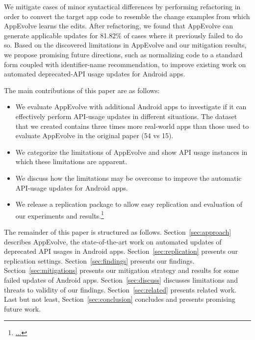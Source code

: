 We mitigate cases of minor syntactical differences by performing refactoring in order to convert the target app code to resemble the change examples from which AppEvolve learns the edits.
After refactoring, we found that AppEvolve can generate applicable updates for 81.82\% of cases where it previously failed to do so.
Based on the discovered limitations in AppEvolve and our mitigation results, we propose promising future directions, such as normalizing code to a standard form coupled with identifier-name recommendation, to improve existing work on automated deprecated-API usage updates for Android apps.

The main contributions of this paper are as follows:
\begin{itemize}
	\item We  evaluate AppEvolve with additional Android apps to investigate if it can effectively perform API-usage updates in different situations. The dataset that we created contains three times more real-world apps than those used to evaluate AppEvolve in the original paper (54 vs 15).
	\item We categorize the limitations of AppEvolve and show API usage instances in which these limitations are apparent.
	\item We discuss how the limitations may be overcome to improve the automatic API-usage updates for Android apps.
	\item We release a replication package to allow easy replication and evaluation of our experiments and results.\footnote{\url{...}}
\end{itemize}

The remainder of this paper is structured as follows. Section~\ref{sec:approach} describes AppEvolve, the state-of-the-art work on automated updates of deprecated API usages in Android apps. Section~\ref{sec:replication} presents our replication settings. Section~\ref{sec:findings} presents our findings. Section~\ref{sec:mitigations} presents our mitigation strategy and results for some failed updates of Android apps.
Section~\ref{sec:discuss} discusses limitations and threats to validity of our findings.
Section~\ref{sec:related} presents related work.
Last but not least, Section~\ref{sec:conclusion} concludes and presents promising future work.
